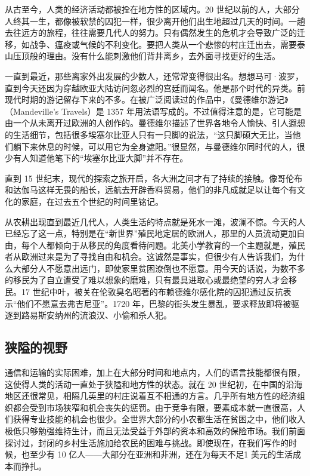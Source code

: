 从古至今，人类的经济活动都被拴在地方性的区域内。20 世纪以前的人，大部分人终其一生，都像被软禁的囚犯一样，很少离开他们出生地超过几天的时间。一趟去往远方的旅程，往往需要几代人的努力。只有偶然发生的危机才会导致广泛的迁移，如战争、瘟疫或气候的不利变化。要把人类从一个悲惨的村庄迁出去，需要泰山压顶般的理由。没有什么能刺激他们背井离乡，去外面寻找更好的生活。

一直到最近，那些离家外出发展的少数人，还常常变得很出名。想想马可·波罗，直到今天还因为穿越欧亚大陆访问忽必烈的宫廷而闻名。他是那个时代的异类。前现代时期的游记留存下来的不多。在被广泛阅读过的作品中，《曼德维尔游记》（Mandeville’s Travels）是 1357 年用法语写成的。不过值得注意的是，它可能是由一个从未离开过欧洲的人创作的。曼德维尔描述了世界各地令人愉快、引人遐想的生活细节，包括很多埃塞尔比亚人只有一只脚的说法，“这只脚硕大无比，当他们躺下来休息的时候，可以用它为全身遮阳。”很显然，与曼德维尔同时代的人，很少有人知道他笔下的“埃塞尔比亚大脚”并不存在。

直到 15 世纪末，现代的探索之旅开启，各大洲之间才有了持续的接触。像哥伦布和达伽马这样无畏的船长，远航去开辟香料贸易，他们的非凡成就足以让每个有文化的家庭，在过去五个世纪的时间里铭记。

从农耕出现直到最近几代人，人类生活的特点就是死水一滩，波澜不惊。今天的人已经忘了这一点，特别是在“新世界”殖民地定居的欧洲人，那里的人员流动更加自由，每个人都倾向于从移民的角度看待问题。北美小学教育的一个主题就是，殖民者从欧洲过来是为了寻找自由和机会。这诚然是事实，但很少有人告诉我们，为什么大部分人不愿意出远门，即使家里贫困潦倒也不愿意。用今天的话说，为数不多的移民为了自立遭受了难以想象的磨难，只有最具进取心或最绝望的穷人才会移民。17 世纪中叶，被关在伦敦臭名昭著的布赖德维尔感化院的囚犯通过反抗表示“他们不愿意去弗吉尼亚”。1720 年，巴黎的街头发生暴乱，要求释放即将被驱逐到路易斯安纳州的流浪汉、小偷和杀人犯。

\subsection{狭隘的视野}
通信和运输的实际困难，加上在大部分时间和地点内，人们的语言技能都很有限，这使得人类的活动一直处于狭隘和地方性的状态。就在 20 世纪初，在中国的沿海地区还很常见，相隔几英里的村庄说着互不相通的方言。几乎所有地方性的经济组织都会受到市场狭窄和机会丧失的惩罚。由于竞争有限，要素成本就一直很高，人们获得专业技能的机会也很少。全世界大部分的小农都生活在贫困之中，他们收入极低只够勉强维持生计，而且无法受益于外部的资本和高效的保险市场。我们前面探讨过，封闭的乡村生活施加给农民的困难与挑战。即使现在，在我们写作的时候，也至少有 10 亿人——大部分在亚洲和非洲，还在为每天不足1 美元的生活成本而挣扎。

